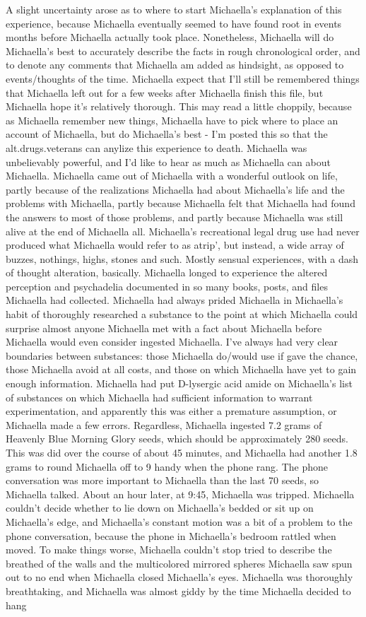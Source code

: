 \documentclass[12pt]{book}
\begin{document}
A slight uncertainty arose as to where to start Michaella's explanation of this experience, because Michaella eventually seemed to have found root in events months before Michaella actually took place. Nonetheless, Michaella will do Michaella's best to accurately describe the facts in rough chronological order, and to denote any comments that Michaella am added as hindsight, as opposed to events/thoughts of the time. Michaella expect that I'll still be remembered things that Michaella left out for a few weeks after Michaella finish this file, but Michaella hope it's relatively thorough. This may read a little choppily, because as Michaella remember new things, Michaella have to pick where to place an account of Michaella, but do Michaella's best - I'm posted this so that the alt.drugs.veterans can anylize this experience to death. Michaella was unbelievably powerful, and I'd like to hear as much as Michaella can about Michaella. Michaella came out of Michaella with a wonderful outlook on life, partly because of the realizations Michaella had about Michaella's life and the problems with Michaella, partly because Michaella felt that Michaella had found the answers to most of those problems, and partly because Michaella was still alive at the end of Michaella all. Michaella's recreational legal drug use had never produced what Michaella would refer to as atrip', but instead, a wide array of buzzes, nothings, highs, stones and such. Mostly sensual experiences, with a dash of thought alteration, basically. Michaella longed to experience the altered perception and psychadelia documented in so many books, posts, and files Michaella had collected. Michaella had always prided Michaella in Michaella's habit of thoroughly researched a substance to the point at which Michaella could surprise almost anyone Michaella met with a fact about Michaella before Michaella would even consider ingested Michaella. I've always had very clear boundaries between substances: those Michaella do/would use if gave the chance, those Michaella avoid at all costs, and those on which Michaella have yet to gain enough information. Michaella had put D-lysergic acid amide on Michaella's list of substances on which Michaella had sufficient information to warrant experimentation, and apparently this was either a premature assumption, or Michaella made a few errors. Regardless, Michaella ingested 7.2 grams of Heavenly Blue Morning Glory seeds, which should be approximately 280 seeds. This was did over the course of about 45 minutes, and Michaella had another 1.8 grams to round Michaella off to 9 handy when the phone rang. The phone conversation was more important to Michaella than the last 70 seeds, so Michaella talked. About an hour later, at 9:45, Michaella was tripped. Michaella couldn't decide whether to lie down on Michaella's bedded or sit up on Michaella's edge, and Michaella's constant motion was a bit of a problem to the phone conversation, because the phone in Michaella's bedroom rattled when moved. To make things worse, Michaella couldn't stop tried to describe the breathed of the walls and the multicolored mirrored spheres Michaella saw spun out to no end when Michaella closed Michaella's eyes. Michaella was thoroughly breathtaking, and Michaella was almost giddy by the time Michaella decided to hang 
\end{document}
